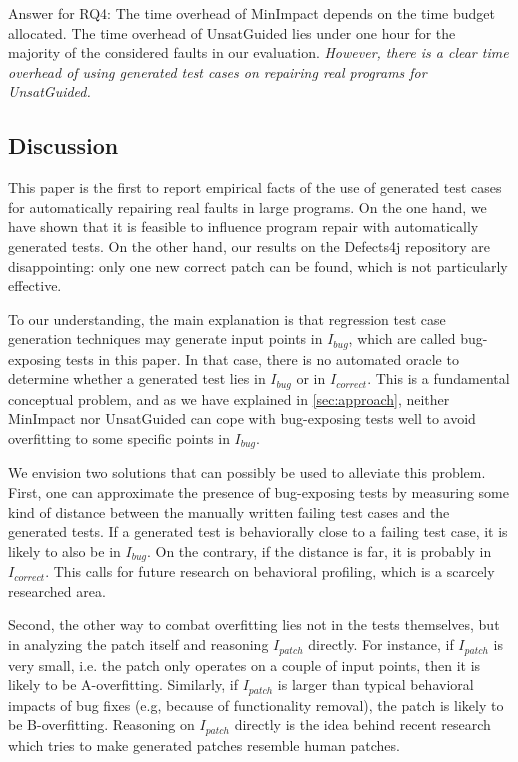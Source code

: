\documentclass[]{sig-alternate}
\begin{document}
Answer for RQ4: The time overhead of MinImpact depends on the time budget allocated. The time overhead of UnsatGuided lies under one hour for the majority of the considered faults in our evaluation. 
\emph{However, there is a clear time overhead of using generated test cases on repairing real programs for UnsatGuided.}

\vspace{-0.5em}
\subsection{Discussion}
\label{sec:discussion}

This paper is the first to report empirical facts of the use of generated test cases for automatically repairing real faults in large programs.
On the one hand, we have shown that it is feasible to influence program repair with automatically generated tests.
On the other hand, our results on the Defects4j repository are disappointing: only one new correct patch can be found, which is not particularly effective.

To our understanding, the main explanation is that regression test case generation techniques may generate input points in $I_{bug}$, which are called bug-exposing tests in this paper. In that case, there is no automated oracle to determine whether a generated test lies in $I_{bug}$ or in $I_{correct}$. This is a fundamental conceptual problem, and as we have explained in \autoref{sec:approach}, neither MinImpact nor UnsatGuided can cope with bug-exposing tests well to avoid overfitting to some specific points in $I_{bug}$.

We envision two solutions that can possibly be used to alleviate this problem. First, one can approximate the presence of bug-exposing tests by measuring some kind of distance between the manually written failing test cases and the generated tests. If a generated test is behaviorally close to a failing test case, it is likely to also be in $I_{bug}$. On the contrary, if the distance is far, it is probably in $I_{correct}$.
This calls for future research on behavioral profiling, which is a scarcely researched area.

Second, the other way to combat overfitting lies not in the tests themselves, but in analyzing the patch itself and reasoning $I_{patch}$ directly.
For instance, if $I_{patch}$ is very small, i.e. the patch only operates on a couple of input points, then it is likely to be A-overfitting.
Similarly, if $I_{patch}$ is larger than typical behavioral impacts of bug fixes (e.g, because of functionality removal), the patch is likely to be B-overfitting. Reasoning on $I_{patch}$ directly is the idea behind recent research \cite{prophet,genesis} which tries to make generated patches resemble human patches.
\end{document}
